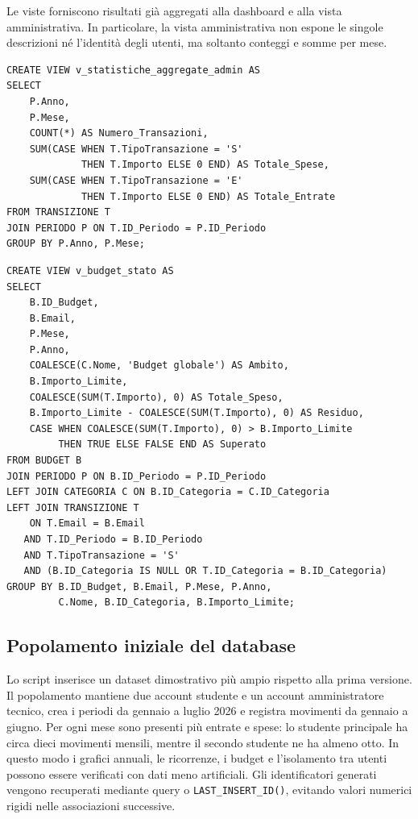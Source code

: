 \documentclass[11pt,a4paper]{article}
\begin{document}
Le viste forniscono risultati già aggregati alla dashboard e alla vista amministrativa. In particolare, la vista amministrativa non espone le singole descrizioni né l'identità degli utenti, ma soltanto conteggi e somme per mese.

\begin{lstlisting}[caption={Vista delle statistiche aggregate per l'amministratore}]
CREATE VIEW v_statistiche_aggregate_admin AS
SELECT
    P.Anno,
    P.Mese,
    COUNT(*) AS Numero_Transazioni,
    SUM(CASE WHEN T.TipoTransazione = 'S'
             THEN T.Importo ELSE 0 END) AS Totale_Spese,
    SUM(CASE WHEN T.TipoTransazione = 'E'
             THEN T.Importo ELSE 0 END) AS Totale_Entrate
FROM TRANSIZIONE T
JOIN PERIODO P ON T.ID_Periodo = P.ID_Periodo
GROUP BY P.Anno, P.Mese;
\end{lstlisting}

\begin{lstlisting}[caption={Vista dello stato dei budget}]
CREATE VIEW v_budget_stato AS
SELECT
    B.ID_Budget,
    B.Email,
    P.Mese,
    P.Anno,
    COALESCE(C.Nome, 'Budget globale') AS Ambito,
    B.Importo_Limite,
    COALESCE(SUM(T.Importo), 0) AS Totale_Speso,
    B.Importo_Limite - COALESCE(SUM(T.Importo), 0) AS Residuo,
    CASE WHEN COALESCE(SUM(T.Importo), 0) > B.Importo_Limite
         THEN TRUE ELSE FALSE END AS Superato
FROM BUDGET B
JOIN PERIODO P ON B.ID_Periodo = P.ID_Periodo
LEFT JOIN CATEGORIA C ON B.ID_Categoria = C.ID_Categoria
LEFT JOIN TRANSIZIONE T
    ON T.Email = B.Email
   AND T.ID_Periodo = B.ID_Periodo
   AND T.TipoTransazione = 'S'
   AND (B.ID_Categoria IS NULL OR T.ID_Categoria = B.ID_Categoria)
GROUP BY B.ID_Budget, B.Email, P.Mese, P.Anno,
         C.Nome, B.ID_Categoria, B.Importo_Limite;
\end{lstlisting}

\subsection{Popolamento iniziale del database}
Lo script  inserisce un dataset dimostrativo pi\`u ampio rispetto alla prima versione. Il popolamento mantiene due account studente e un account amministratore tecnico, crea i periodi da gennaio a luglio 2026 e registra movimenti da gennaio a giugno. Per ogni mese sono presenti pi\`u entrate e spese: lo studente principale ha circa dieci movimenti mensili, mentre il secondo studente ne ha almeno otto. In questo modo i grafici annuali, le ricorrenze, i budget e l'isolamento tra utenti possono essere verificati con dati meno artificiali. Gli identificatori generati vengono recuperati mediante query o \texttt{LAST\_INSERT\_ID()}, evitando valori numerici rigidi nelle associazioni successive.
\end{document}
